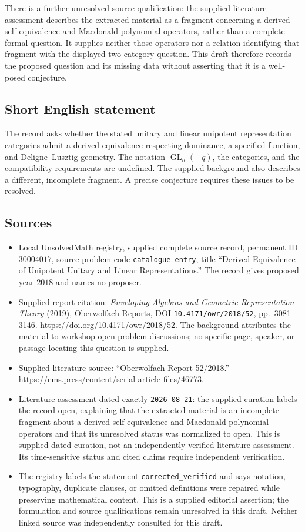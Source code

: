 \documentclass[11pt]{article}
\begin{document}
There is a further unresolved source qualification: the supplied literature assessment describes the extracted material as a fragment concerning a derived self-equivalence and Macdonald-polynomial operators, rather than a complete formal question. It supplies neither those operators nor a relation identifying that fragment with the displayed two-category question. This draft therefore records the proposed question and its missing data without asserting that it is a well-posed conjecture.
\subsection{Short English statement}
The record asks whether the stated unitary and linear unipotent representation categories admit a derived equivalence respecting dominance, a specified function, and Deligne--Lusztig geometry. The notation \(\operatorname{GL}_n(-q)\), the categories, and the compatibility requirements are undefined. The supplied background also describes a different, incomplete fragment. A precise conjecture requires these issues to be resolved.
\subsection{Sources}
\begin{itemize}
\item Local UnsolvedMath registry, supplied complete source record, permanent ID \(30004017\), source problem code \texttt{catalogue entry}, title ``Derived Equivalence of Unipotent Unitary and Linear Representations.'' The record gives proposed year \(2018\) and names no proposer.
\item Supplied report citation: \emph{Enveloping Algebras and Geometric Representation Theory} (2019), Oberwolfach Reports, DOI \texttt{10.4171/owr/2018/52}, pp.\ 3081--3146. \url{https://doi.org/10.4171/owr/2018/52}. The background attributes the material to workshop open-problem discussions; no specific page, speaker, or passage locating this question is supplied.
\item Supplied literature source: ``Oberwolfach Report 52/2018.'' \url{https://ems.press/content/serial-article-files/46773}.
\item Literature assessment dated exactly \texttt{2026-08-21}: the supplied curation labels the record open, explaining that the extracted material is an incomplete fragment about a derived self-equivalence and Macdonald-polynomial operators and that its unresolved status was normalized to open. This is supplied dated curation, not an independently verified literature assessment. Its time-sensitive status and cited claims require independent verification.
\item The registry labels the statement \texttt{corrected\_verified} and says notation, typography, duplicate clauses, or omitted definitions were repaired while preserving mathematical content. This is a supplied editorial assertion; the formulation and source qualifications remain unresolved in this draft. Neither linked source was independently consulted for this draft.
\end{itemize}
\end{document}
